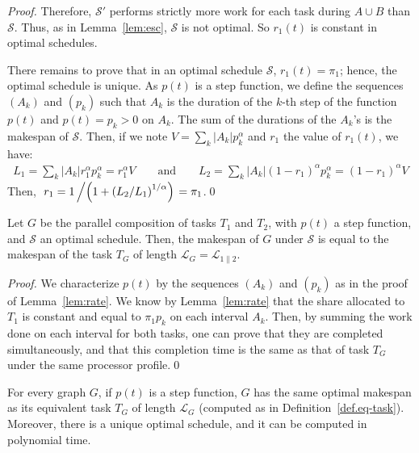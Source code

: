 \documentclass{llncs}
\newcommand{\LG}[1]{\mathcal{L}_{#1}}
\newcommand{\para}[2]{#1 \mathop{\parallel} #2}
\newcommand{\s}{\mathcal S\xspace}
\begin{document}
\begin{proof}
Therefore, $\s'$ performs strictly more work for each task during $A\cup B$ than
$\s$. Thus, as in Lemma~\ref{lem:esc}, $\s$ is not optimal. So
$r_1(t)$ is constant in optimal schedules.



There remains to prove that in an optimal schedule $\s$, $r_1(t) =
\pi_1$; hence, the optimal schedule is unique.  As $p(t)$ is a step
function, we define the sequences $\left(A_k\right)$ and
$\left(p_k\right)$ such that $A_k$ is the duration of the $k$-th
step of the function $p(t)$ and $p(t)=p_k>0$ on $A_k$. The sum of the
durations of the $A_k$'s is the makespan of $\s$.
Then, if we note $V = \sum_k |A_k| p_k^\alpha$ and $r_1$ the value of $r_1(t)$,
we have:
$$
\begin{array}{c}\displaystyle
L_1 = \sum_k |A_k| r_1^\alpha p_k^\alpha = r_1^\alpha V
\qquad\displaystyle\text{and}\qquad 
 L_2 = \sum_k |A_k| (1-r_1)^\alpha p_k^\alpha = (1-r_1)^\alpha V
\end{array}
$$
Then, $\ r_1 = {1}\left/\left({1+\left({L_2}/{L_1}\right)^
      {1/\alpha}}\right)\right.  = \pi_1$.\qed
\end{proof}



\begin{lemma}
  \label{lem:ratequiv}
  Let $G$ be the parallel composition of tasks $T_1$ and $T_2$, with
  $p(t)$ a step function, and $\s$ an optimal schedule. Then, the
  makespan of $G$ under $\s$ is equal to the makespan of the task
  $T_G$ of length $\LG G = \LG{\para 12}$.
\end{lemma}

\begin{proof}  
  We characterize $p(t)$ by the sequences $(A_k)$ and $(p_k)$ as in the proof of
  Lemma~\ref{lem:rate}. We know by Lemma~\ref{lem:rate} that the share allocated
  to $T_1$ is constant and equal to $\pi_1p_k$ on each interval $A_k$.
Then, by summing the work done on each interval for both tasks, one can prove
  that they are completed simultaneously, and that this completion time is the
  same as that of task $T_G$ under the same processor profile.\qed
\end{proof}



\begin{theorem}
  \label{th:step}
  For every graph $G$, if $p(t)$ is a step function, $G$ has the same
  optimal makespan as its equivalent task $T_G$ of length $\LG
  G$ (computed as in Definition~\ref{def.eq-task}). Moreover, there is a unique optimal schedule, and it can be
  computed in polynomial time.
\end{theorem}
\end{document}
